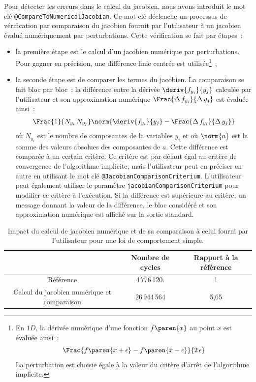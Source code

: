 \documentclass[rectoverso,pleiades,pstricks,leqno,anti]{texmf/note_technique_2010}
\newcommand{\varcpp}[1]{\texttt{#1}}
\begin{document}
Pour détecter les erreurs dans le calcul du jacobien, nous avons
introduit le mot clé \texttt{@Compare\-To\-Numerical\-Jacobian}. Ce mot
clé déclenche un processus de vérification par comparaison du jacobien
fournit par l'utilisateur à un jacobien évalué numériquement par
perturbations. Cette vérification se fait par étapes~:
\begin{itemize}
  \item la première étape est le calcul d'un jacobien numérique
  par perturbations. Pour gagner en précision, une différence finie
  centrée est utilisée\footnote{En \(1D\), la dérivée numérique d'une
    fonction \(f\paren{x}\) au point \(x\) est évaluée ainsi~:
    \[
    \Frac{f\paren{x+\epsilon}-f\paren{x-\epsilon}}{2\,\epsilon}
    \]
    La perturbation est choisie égale à la valeur du critère
    d'arrêt de l'algorithme implicite. }~;
  \item la seconde étape est de comparer les termes du jacobien.
  La comparaison se fait bloc par bloc~: la différence entre la dérivée
  \(\deriv{f_{y_{i}}}{y_{j}}\) calculée par l'utilisateur et son
  approximation numérique \(\Frac{\Delta\,f_{y_{i}}}{\Delta\,y_{j}}\)
  est évaluée ainsi~:
  \[
  \Frac{1}{N_{y_{i}}\,N_{y_{j}}}\norm{\deriv{f_{y_{i}}}{y_{j}}-\Frac{\Delta\,f_{y_{i}}}{\Delta\,y_{j}}}
  \]
  où \(N_{y_{i}}\) est le nombre de composantes de la variables
  \(y_{i}\) et où \(\norm{a}\) est la somme des valeurs absolues des
  composantes de \(a\). Cette différence est comparée à un certain
  critère. Ce critère est par défaut égal au critère de convergence de
  l'algorithme implicite, mais l'utilisateur peut en préciser en autre
  en utilisant le mot clé {\tt @Jacobian\-Comparison\-Criterium}.
  L'utilisateur peut également utiliser le paramètre
  \varcpp{jacobian\-Comparison\-Criterium} pour modifier ce critère à
  l'exécution. Si la différence est supérieure au critère, un message
  donnant la valeur de la différence, le bloc considéré et son
  approximation numérique est affiché sur la sortie standard.
\end{itemize}

\begin{table}
  \centering
  \begin{tabular}{|c|c|c|}
    \cline{2-3}
    \multicolumn{1}{c|}{} & 
    \begin{minipage}{4cm}
      Nombre de cycles
    \end{minipage} &
    \begin{minipage}{4cm}
      Rapport à la référence
    \end{minipage} \\
    \hline
    Référence             & 4\,776\,120. & 1 \\
    \hline
    \begin{minipage}[p]{4cm}
    Calcul du jacobien numérique et comparaison  
    \end{minipage}
    & 26\,944\,564 & 5,65\\
    \hline
  \end{tabular}
  \label{tab:NR:nJ}
  \caption{Impact du calcul de jacobien numérique et de sa comparaison à
    celui fourni par l'utilisateur pour une loi de comportement simple.}
\end{table}
\end{document}
